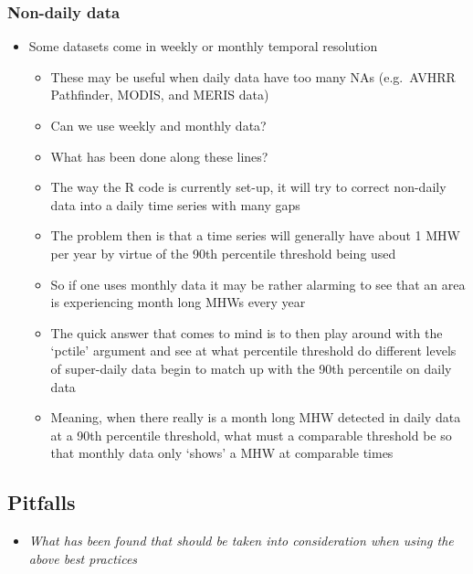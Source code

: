 \documentclass[]{article}
\providecommand{\tightlist}{%
  \setlength{\itemsep}{0pt}\setlength{\parskip}{0pt}}
\begin{document}
\subsubsection{Non-daily data}\label{non-daily-data}

\begin{itemize}
\tightlist
\item
  Some datasets come in weekly or monthly temporal resolution

  \begin{itemize}
  \tightlist
  \item
    These may be useful when daily data have too many NAs (e.g.~AVHRR
    Pathfinder, MODIS, and MERIS data)
  \item
    Can we use weekly and monthly data?
  \item
    What has been done along these lines?
  \item
    The way the R code is currently set-up, it will try to correct
    non-daily data into a daily time series with many gaps
  \item
    The problem then is that a time series will generally have about 1
    MHW per year by virtue of the 90th percentile threshold being used
  \item
    So if one uses monthly data it may be rather alarming to see that an
    area is experiencing month long MHWs every year
  \item
    The quick answer that comes to mind is to then play around with the
    `pctile' argument and see at what percentile threshold do different
    levels of super-daily data begin to match up with the 90th
    percentile on daily data
  \item
    Meaning, when there really is a month long MHW detected in daily
    data at a 90th percentile threshold, what must a comparable
    threshold be so that monthly data only `shows' a MHW at comparable
    times
  \end{itemize}
\end{itemize}

\subsection{Pitfalls}\label{pitfalls}

\begin{itemize}
\tightlist
\item
  \emph{What has been found that should be taken into consideration when
  using the above best practices}
\end{itemize}
\end{document}
